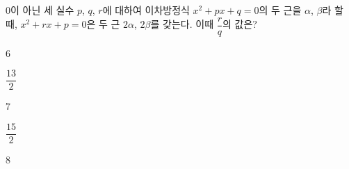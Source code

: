 $0$이 아닌 세 실수 $p$, $q$, $r$에 대하여 이차방정식 $x^2+px+q=0$의 두 근을 $\alpha$, $\beta$라 할 때, $x^2+rx+p=0$은 두 근 $2\alpha$, $2\beta$를 갖는다. 이때 $\dfrac{r}{q}$의 값은?
\begin{choices32}{\rule[-3ex]{0pt}{8ex}$6$}{\rule[-3ex]{0pt}{8ex}$\dfrac{13}{2}$}{\rule[-3ex]{0pt}{8ex}$7$}{\rule[-3ex]{0pt}{8ex}$\dfrac{15}{2}$}{\rule[-3ex]{0pt}{8ex}$8$}\end{choices32}
